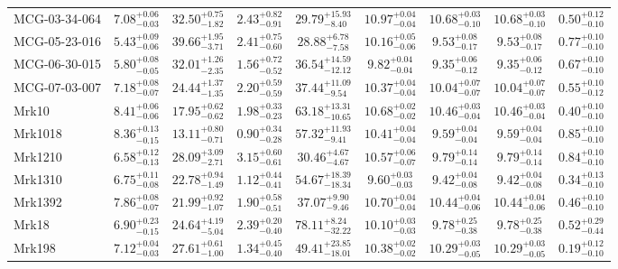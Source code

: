 \documentclass[onecolumn]{mn2e}
\begin{document}
{\begin{center}
\begin{longtable}{lcccccccc}
MCG-03-34-064 & $7.08_{-0.03}^{+0.06}$ & $32.50_{-1.82}^{+0.75}$ & $2.43_{-0.91}^{+0.82}$ &$29.79_{-8.40}^{+15.93}$ & $10.97_{-0.04}^{+0.04}$ & $10.68_{-0.10}^{+0.03}$ & $10.68_{-0.10}^{+0.03}$ & $0.50_{-0.10}^{+0.12}$ \\
MCG-05-23-016 & $5.43_{-0.06}^{+0.09}$ & $39.66_{-3.71}^{+1.95}$ & $2.41_{-0.60}^{+0.75}$ &$28.88_{-7.58}^{+6.78}$ & $10.16_{-0.06}^{+0.05}$ & $9.53_{-0.17}^{+0.08}$ & $9.53_{-0.17}^{+0.08}$ & $0.77_{-0.10}^{+0.10}$ \\
MCG-06-30-015 & $5.80_{-0.05}^{+0.08}$ & $32.01_{-2.35}^{+1.26}$ & $1.56_{-0.52}^{+0.72}$ &$36.54_{-12.12}^{+14.59}$ & $9.82_{-0.04}^{+0.04}$ & $9.35_{-0.12}^{+0.06}$ & $9.35_{-0.12}^{+0.06}$ & $0.67_{-0.10}^{+0.10}$ \\
MCG-07-03-007 & $7.18_{-0.07}^{+0.08}$ & $24.44_{-1.35}^{+1.37}$ & $2.20_{-0.59}^{+0.59}$ &$37.44_{-9.54}^{+11.09}$ & $10.37_{-0.04}^{+0.04}$ & $10.04_{-0.07}^{+0.07}$ & $10.04_{-0.07}^{+0.07}$ & $0.55_{-0.12}^{+0.10}$ \\
Mrk10 & $8.41_{-0.06}^{+0.06}$ & $17.95_{-0.62}^{+0.62}$ & $1.98_{-0.23}^{+0.33}$ &$63.18_{-10.65}^{+13.31}$ & $10.68_{-0.02}^{+0.02}$ & $10.46_{-0.04}^{+0.03}$ & $10.46_{-0.04}^{+0.03}$ & $0.40_{-0.10}^{+0.10}$ \\
Mrk1018 & $8.36_{-0.15}^{+0.13}$ & $13.11_{-0.71}^{+0.80}$ & $0.90_{-0.28}^{+0.34}$ &$57.32_{-9.41}^{+11.93}$ & $10.41_{-0.04}^{+0.04}$ & $9.59_{-0.04}^{+0.04}$ & $9.59_{-0.04}^{+0.04}$ & $0.85_{-0.10}^{+0.10}$ \\
Mrk1210 & $6.58_{-0.13}^{+0.12}$ & $28.09_{-2.71}^{+3.09}$ & $3.15_{-0.61}^{+0.60}$ &$30.46_{-4.67}^{+4.67}$ & $10.57_{-0.07}^{+0.06}$ & $9.79_{-0.14}^{+0.14}$ & $9.79_{-0.14}^{+0.14}$ & $0.84_{-0.10}^{+0.10}$ \\
Mrk1310 & $6.75_{-0.08}^{+0.11}$ & $22.78_{-1.49}^{+0.94}$ & $1.12_{-0.41}^{+0.44}$ &$54.67_{-18.34}^{+18.39}$ & $9.60_{-0.03}^{+0.03}$ & $9.42_{-0.08}^{+0.04}$ & $9.42_{-0.08}^{+0.04}$ & $0.34_{-0.10}^{+0.13}$ \\
Mrk1392 & $7.86_{-0.07}^{+0.08}$ & $21.99_{-1.07}^{+0.92}$ & $1.90_{-0.51}^{+0.58}$ &$37.07_{-9.46}^{+9.90}$ & $10.70_{-0.04}^{+0.04}$ & $10.44_{-0.06}^{+0.04}$ & $10.44_{-0.06}^{+0.04}$ & $0.46_{-0.10}^{+0.10}$ \\
Mrk18 & $6.90_{-0.15}^{+0.23}$ & $24.64_{-5.04}^{+4.19}$ & $2.39_{-0.40}^{+0.20}$ &$78.11_{-32.22}^{+8.24}$ & $10.10_{-0.03}^{+0.03}$ & $9.78_{-0.38}^{+0.25}$ & $9.78_{-0.38}^{+0.25}$ & $0.52_{-0.44}^{+0.29}$ \\
Mrk198 & $7.12_{-0.03}^{+0.04}$ & $27.61_{-1.00}^{+0.61}$ & $1.34_{-0.40}^{+0.45}$ &$49.41_{-18.01}^{+23.85}$ & $10.38_{-0.02}^{+0.02}$ & $10.29_{-0.05}^{+0.03}$ & $10.29_{-0.05}^{+0.03}$ & $0.19_{-0.10}^{+0.12}$ \\

\end{longtable}
\end{center}}
\end{document}
